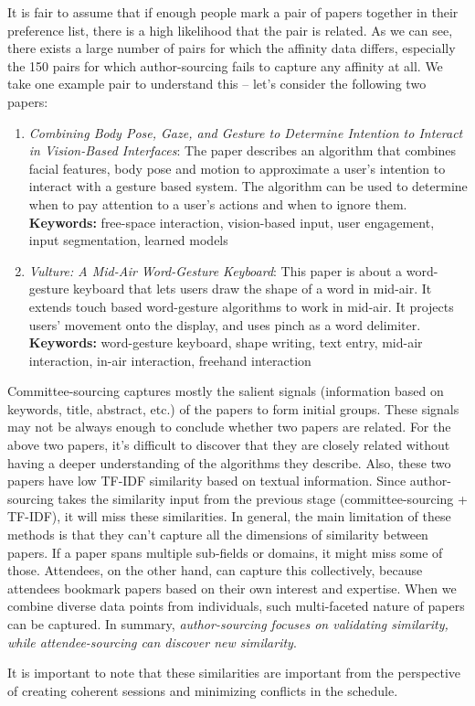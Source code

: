 \documentclass[letterpaper]{article}
\begin{document}
\begin{enumerate}
It is fair to assume that if enough people mark a pair of papers together in their preference list, there is a high likelihood that the pair is related. As we can see, there exists a large number of pairs for which the affinity data differs, especially the 150 pairs for which author-sourcing fails to capture any affinity at all. We take one example pair to understand this -- let's consider the following two papers:
\begin{enumerate}
\item \emph{Combining Body Pose, Gaze, and Gesture to Determine Intention to Interact in Vision-Based Interfaces}: The paper describes an algorithm that combines facial features, body pose and motion to approximate a user's intention to interact with a gesture based system. The algorithm can be used to determine when to pay attention to a user's actions and when to ignore them. \textbf{Keywords:} free-space interaction, vision-based input, user engagement, input segmentation, learned models


\item \emph{Vulture: A Mid-Air Word-Gesture Keyboard}: This paper is about a word-gesture keyboard that lets users draw the shape of a word in mid-air. It extends touch based word-gesture algorithms to work in mid-air. It projects users' movement onto the display, and uses pinch as a word delimiter. \textbf{Keywords:} word-gesture keyboard, shape writing, text entry, mid-air interaction, in-air interaction, freehand interaction
\end{enumerate}

Committee-sourcing captures mostly the salient signals (information based on keywords, title, abstract, etc.) of the papers to form initial groups. These signals may not be always enough to conclude whether two papers are related. For the above two papers, it's difficult to discover that they are closely related without having a deeper understanding of the algorithms they describe.  Also, these two papers have low TF-IDF similarity based on textual information. Since author-sourcing takes the similarity input from the previous stage (committee-sourcing + TF-IDF), it will miss these similarities. In general, the main limitation of these methods is that they can't capture all the dimensions of similarity between papers. If a paper spans multiple sub-fields or domains, it might miss some of those. Attendees, on the other hand, can capture this collectively, because attendees bookmark papers based on their own interest and expertise. When we combine diverse data points from individuals, such multi-faceted nature of papers can be captured. In summary, \emph{author-sourcing focuses on validating similarity, while attendee-sourcing can discover new similarity}.

It is important to note that these similarities are important from the perspective of creating coherent sessions and minimizing conflicts in the schedule.
\end{enumerate}
\end{document}
